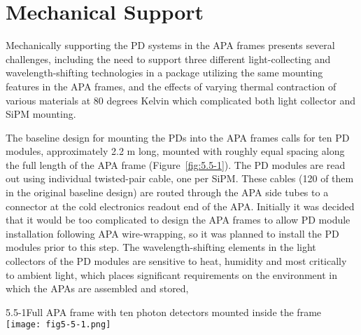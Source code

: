 \section{Mechanical Support}

Mechanically supporting the PD systems in the APA frames
presents several challenges, including the need to support three
different light-collecting and wavelength-shifting technologies in a
package utilizing the same mounting features in the APA frames, and
the effects of varying thermal contraction of various materials at 80
degrees Kelvin which complicated both light collector and SiPM
mounting. 

The baseline  design for mounting the PDs into the APA frames calls for
ten PD modules, approximately 2.2 m long, mounted with roughly equal
spacing along the full length of the APA frame (Figure~\ref{fig:5.5-1}).  The
PD modules are read out using individual twisted-pair cable, one per
SiPM.  These cables (120 of them in the original baseline  design) are
routed through the APA side tubes to a connector at the cold
electronics readout end of the APA.  Initially it was decided that it
would be too complicated to design the APA frames to allow PD module
installation following APA wire-wrapping, so it was planned to install 
the PD modules %
prior to this step.%
The
wavelength-shifting elements in the light collectors of the PD modules
are sensitive to heat, humidity and most critically to %
ambient light, which places significant requirements  on the
environment in which the APAs are assembled and stored,%

\begin{cdrfigure}{5.5-1}{Full APA frame with ten photon detectors mounted
  inside the frame}
   \texttt{[image: fig5-5-1.png]}
\end{cdrfigure}

